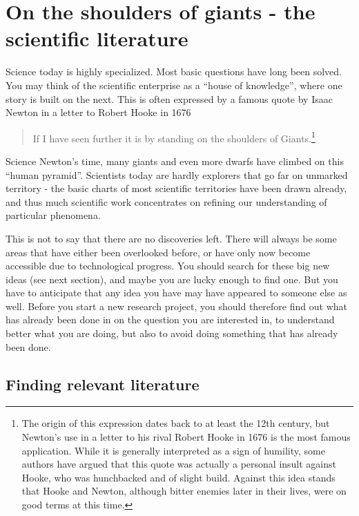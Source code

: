 \documentclass{tufte-book}
\begin{document}


\chapter{On the shoulders of giants - the scientific literature}

Science today is highly specialized. Most basic questions have long been solved. You may think of the scientific enterprise as a ``house of knowledge'', where one story is built on the next. This is often expressed by a famous quote by Isaac Newton in a letter to Robert Hooke in 1676

\begin{quote}
If I have seen further it is by standing on the shoulders of Giants.\footnote{The origin of this expression dates back to at least the 12th century, but Newton's use in a letter to his rival Robert Hooke in 1676 is the most famous application. While it is generally interpreted as a sign of humility, some authors have argued that this quote was actually a personal insult against Hooke, who was hunchbacked and of slight build. Against this idea stands that Hooke and Newton, although bitter enemies later in their lives, were on good terms at this time.}
\end{quote}

Science Newton's time, many giants and even more dwarfs have climbed on this ``human pyramid''. Scientists today are hardly explorers that go far on unmarked territory - the basic charts of most scientific territories have been drawn already, and thus much scientific work concentrates on refining our understanding of particular phenomena. 

This is not to say that there are no discoveries left. There will always be some areas that have either been overlooked before, or have only now become accessible due to technological progress. You should search for these big new ideas (see next section), and maybe you are lucky enough to find one. But you have to anticipate that any idea you have may have appeared to someone else as well. Before you start a new research project, you should therefore find out what has already been done in on the question you are interested in, to understand better what you are doing, but also to avoid doing something that has already been done. 


\section{Finding relevant literature}
 
\end{document}
